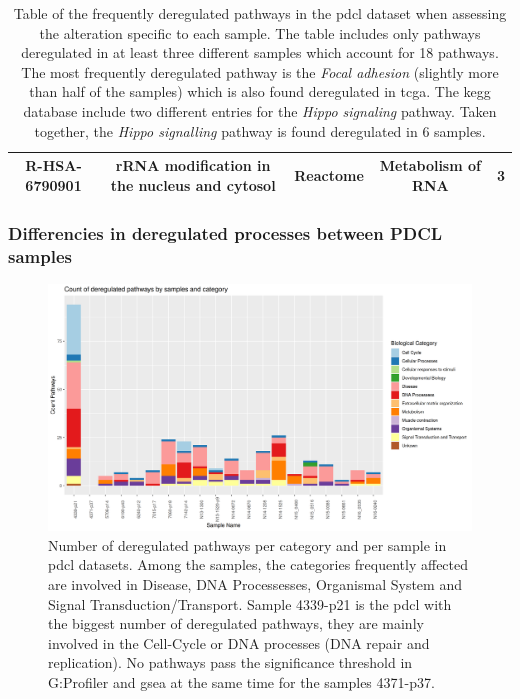 \begin{table}
{\begin{tabular}{ |c|c|c|c|c| }
            R-HSA-6790901 & rRNA modification in the nucleus and cytosol & Reactome & Metabolism of RNA & 3 \\
            \hline
        \end{tabular}
    }
    \caption{
        Table of the frequently deregulated pathways in the \acrshort{pdcl} dataset when assessing the alteration specific to each sample.
        The table includes only pathways deregulated in at least three different samples which account for 18 pathways.
        The most frequently deregulated pathway is the \textit{Focal adhesion} (slightly more than half of the samples) which is also found deregulated in \acrshort{tcga}.
        The \acrshort{kegg} database include two different entries for the \textit{Hippo signaling} pathway.
        Taken together, the \textit{Hippo signalling} pathway is found deregulated in 6 samples.
    }
    \label{table:frequently-dereg-pathways}
\end{table}

\subsubsection{Differencies in deregulated processes between PDCL samples}

\begin{figure}
    \includegraphics[width=\textwidth]{img/barplot-categ-pdcl}
    \caption{
        Number of deregulated pathways per category and per sample in \acrshort{pdcl} datasets.
        Among the samples, the categories frequently affected are involved in Disease, DNA Processesses, Organismal System and Signal Transduction/Transport.
        Sample 4339-p21 is the \acrshort{pdcl} with the biggest number of deregulated pathways, they are mainly involved in the Cell-Cycle or DNA processes (DNA repair and replication).
        No pathways pass the significance threshold in G:Profiler and \acrshort{gsea} at the same time for the samples 4371-p37.
    }
    \label{fig:barplot-categ-pdcl}
\end{figure}

